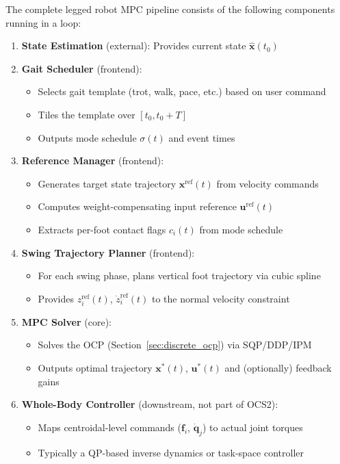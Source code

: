 \documentclass[11pt,a4paper]{article}
\begin{document}
The complete legged robot MPC pipeline consists of the following components running in a loop:

\begin{enumerate}
	\item \textbf{State Estimation} (external): Provides current state $\hat{\bm{x}}(t_0)$

	\item \textbf{Gait Scheduler} (frontend):
	      \begin{itemize}
		      \item Selects gait template (trot, walk, pace, etc.) based on user command
		      \item Tiles the template over $[t_0, t_0+T]$
		      \item Outputs mode schedule $\sigma(t)$ and event times
	      \end{itemize}

	\item \textbf{Reference Manager} (frontend):
	      \begin{itemize}
		      \item Generates target state trajectory $\bm{x}^{\text{ref}}(t)$ from velocity commands
		      \item Computes weight-compensating input reference $\bm{u}^{\text{ref}}(t)$
		      \item Extracts per-foot contact flags $c_i(t)$ from mode schedule
	      \end{itemize}

	\item \textbf{Swing Trajectory Planner} (frontend):
	      \begin{itemize}
		      \item For each swing phase, plans vertical foot trajectory via cubic spline
		      \item Provides $z_i^{\text{ref}}(t)$, $\dot{z}_i^{\text{ref}}(t)$ to the normal velocity constraint
	      \end{itemize}

	\item \textbf{MPC Solver} (core):
	      \begin{itemize}
		      \item Solves the OCP (Section~\ref{sec:discrete_ocp}) via SQP/DDP/IPM
		      \item Outputs optimal trajectory $\bm{x}^*(t)$, $\bm{u}^*(t)$ and (optionally) feedback gains
	      \end{itemize}

	\item \textbf{Whole-Body Controller} (downstream, not part of OCS2):
	      \begin{itemize}
		      \item Maps centroidal-level commands ($\bm{f}_i$, $\dot{\bm{q}}_j$) to actual joint torques
		      \item Typically a QP-based inverse dynamics or task-space controller
	      \end{itemize}
\end{enumerate}
\end{document}
